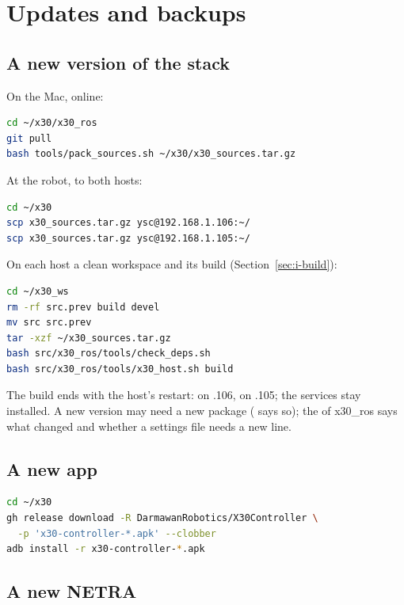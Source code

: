 \chapter{Updates and backups}
\label{ch:i-updates}

\section{A new version of the stack}

On the Mac, online:

\begin{lstlisting}[language=bash]
cd ~/x30/x30_ros
git pull
bash tools/pack_sources.sh ~/x30/x30_sources.tar.gz
\end{lstlisting}

At the robot, to both hosts:

\begin{lstlisting}[language=bash]
cd ~/x30
scp x30_sources.tar.gz ysc@192.168.1.106:~/
scp x30_sources.tar.gz ysc@192.168.1.105:~/
\end{lstlisting}

On each host a clean workspace and its build (Section~\ref{sec:i-build}):

\begin{lstlisting}[language=bash]
cd ~/x30_ws
rm -rf src.prev build devel
mv src src.prev
tar -xzf ~/x30_sources.tar.gz
bash src/x30_ros/tools/check_deps.sh
bash src/x30_ros/tools/x30_host.sh build
\end{lstlisting}

The build ends with the host's restart:  on .106,
 on .105; the services stay installed. A new version
may need a new package ( says so); the  of x30\_ros says
what changed and whether a settings file needs a new line.

\section{A new app}

\begin{lstlisting}[language=bash]
cd ~/x30
gh release download -R DarmawanRobotics/X30Controller \
  -p 'x30-controller-*.apk' --clobber
adb install -r x30-controller-*.apk
\end{lstlisting}

\section{A new NETRA}

